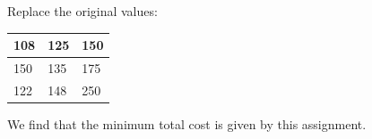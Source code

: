 Replace the original values:

\begin{table}[H]
\centering
\begin{tabular}{|m{0.5cm}|m{0.5cm}|m{0.5cm}|}
  \hline
  108 & 125 & \cellcolor{yellow!25} 150 \\
  \hline
  150 & \cellcolor{yellow!25} 135 & 175 \\
  \hline
  \cellcolor{yellow!25} 122 & 148 & 250 \\
  \hline
\end{tabular}
\end{table}

We find that the minimum total cost is given by this assignment.